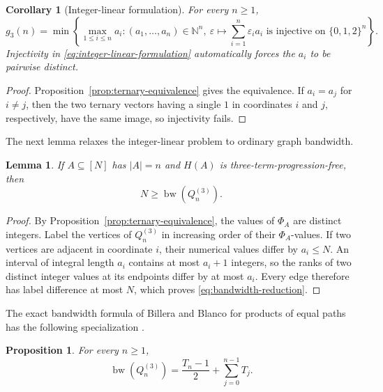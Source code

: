 \documentclass[11pt]{article}
\numberwithin{equation}{section}
\newtheorem{lemma}[theorem]{Lemma}
\newtheorem{proposition}[theorem]{Proposition}
\newtheorem{corollary}[theorem]{Corollary}
\theoremstyle{definition}
\theoremstyle{remark}
\newcommand{\N}{\mathbb{N}}
\newcommand{\eps}{\varepsilon}
\newcommand{\bw}{\operatorname{bw}}
\begin{document}
\begin{corollary}[Integer-linear formulation]\label{cor:integer-linear-formulation}
For every $n\ge1$,
\begin{equation}\label{eq:integer-linear-formulation}
g_3(n)=\min\left\{
\max_{1\le i\le n}a_i:
(a_1,\ldots,a_n)\in\N^n,
\ \eps\mapsto\sum_{i=1}^n\eps_i a_i
\text{ is injective on }\{0,1,2\}^n
\right\}.
\end{equation}
Injectivity in \eqref{eq:integer-linear-formulation} automatically forces the $a_i$ to be pairwise distinct.
\end{corollary}

\begin{proof}
Proposition~\ref{prop:ternary-equivalence} gives the equivalence. If $a_i=a_j$ for $i\ne j$, then the two ternary vectors having a single $1$ in coordinates $i$ and $j$, respectively, have the same image, so injectivity fails.
\end{proof}

\smallskip
\noindent
The next lemma relaxes the integer-linear problem to ordinary graph bandwidth.

\begin{lemma}\label{lem:bandwidth-reduction}
If $A\subseteq[N]$ has $|A|=n$ and $H(A)$ is three-term-progression-free, then
\begin{equation}\label{eq:bandwidth-reduction}
N\ge\bw\!\left(Q_n^{(3)}\right).
\end{equation}
\end{lemma}

\begin{proof}
By Proposition~\ref{prop:ternary-equivalence}, the values of $\Phi_A$ are distinct integers. Label the vertices of $Q_n^{(3)}$ in increasing order of their $\Phi_A$-values. If two vertices are adjacent in coordinate $i$, their numerical values differ by $a_i\le N$. An interval of integral length $a_i$ contains at most $a_i+1$ integers, so the ranks of two distinct integer values at its endpoints differ by at most $a_i$. Every edge therefore has label difference at most $N$, which proves \eqref{eq:bandwidth-reduction}.
\end{proof}

\smallskip
\noindent
The exact bandwidth formula of Billera and Blanco for products of equal paths has the following specialization \cite[Theorem 2.3 and Lemma 3.1]{BilleraBlanco2013}.

\begin{proposition}\label{prop:ternary-grid-bandwidth}
For every $n\ge1$,
\begin{equation}\label{eq:ternary-grid-bandwidth}
\bw\!\left(Q_n^{(3)}\right)=\frac{T_n-1}{2}+\sum_{j=0}^{n-1}T_j.
\end{equation}
\end{proposition}
\end{document}
